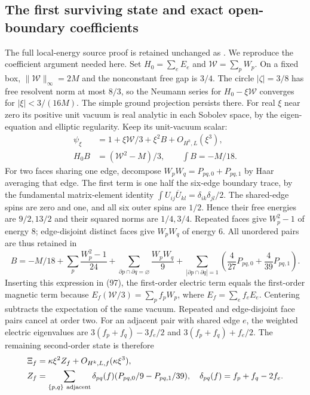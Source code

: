 \documentclass[11pt]{article}
\begin{document}
\subsection{The first surviving state and exact open-boundary coefficients}
The full local-energy source proof is retained unchanged as
. We reproduce the
coefficient argument needed here. Set $H_0=\sum_eE_e$ and
$\mathcal W=\sum_pW_p$. On a fixed box, $\|\mathcal W\|_\infty=2M$ and
the nonconstant free gap is $3/4$.
The circle $|\zeta|=3/8$ has free resolvent norm at most $8/3$, so the
Neumann series for $H_0-\xi\mathcal W$ converges for $|\xi|<3/(16M)$.
The simple ground projection persists there. For real $\xi$ near zero
its positive unit vacuum is real analytic in each Sobolev space, by the
eigen-equation and elliptic regularity. Keep its unit-vacuum scalar:
\begin{align*}
 \psi_\xi&=1+\xi\mathcal W/3+\xi^2 B+O_{H^k,L}(\xi^3),\\
 H_0B&=(\mathcal W^2-M)/3,\qquad \int B=-M/18.
\end{align*}
For two faces sharing one edge, decompose
$W_pW_q=P_{pq,0}+P_{pq,1}$ by Haar averaging that edge.
The first term is one half the six-edge boundary trace, by the
fundamental matrix-element identity $\int U_{ij}\overline U_{kl}
=\delta_{ik}\delta_{jl}/2$.
The shared-edge spins are zero and one, and all six outer spins
are $1/2$. Hence their free energies are $9/2,13/2$ and their squared
norms are $1/4,3/4$.
Repeated faces give $W_p^2-1$ of energy $8$; edge-disjoint distinct faces
give $W_pW_q$ of energy $6$. All unordered pairs are thus retained in
\[
 B=-M/18+\sum_p\frac{W_p^2-1}{24}
  +\sum_{\partial p\cap\partial q=\varnothing}\frac{W_pW_q}{9}
  +\sum_{|\partial p\cap\partial q|=1}
       \left(\frac4{27}P_{pq,0}+\frac4{39}P_{pq,1}\right).
\]
Inserting this expression in (97), the first-order
electric term equals the first-order magnetic term because
$E_f(\mathcal W/3)=\sum_pf_pW_p$, where $E_f=\sum_ef_eE_e$.
Centering subtracts the expectation of the same vacuum.
Repeated and edge-disjoint face pairs cancel at order two.
For an adjacent pair with shared edge $e$, the weighted electric
eigenvalues are $3(f_p+f_q)-3f_e/2$ and $3(f_p+f_q)+f_e/2$.
The remaining second-order state is therefore
\begin{align}
 \Xi_f&=\kappa\xi^2 Z_f+O_{H^k,L,f}(\kappa\xi^3),\nonumber\\
 Z_f&=\sum_{\{p,q\}\ {\rm adjacent}}\delta_{pq}(f)
         (P_{pq,0}/9-P_{pq,1}/39),\quad
 \delta_{pq}(f)=f_p+f_q-2f_e. \label{eq:fabel-adjacent-state}
\end{align}
\end{document}
